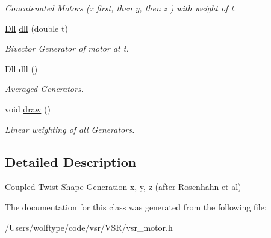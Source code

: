 \begin{DoxyCompactItemize}
\begin{DoxyCompactList}\small\item\em Concatenated Motors (x first, then y, then z ) with weight of t. \end{DoxyCompactList}\item 
\hypertarget{classvsr_1_1_coupled_twist_a1ed7598ed8ee660d1ead00ca99a66d74}{\hyperlink{namespacevsr_a6c6892b7aec25cfb16492501e2e35b11}{Dll} \hyperlink{classvsr_1_1_coupled_twist_a1ed7598ed8ee660d1ead00ca99a66d74}{dll} (double t)}\label{classvsr_1_1_coupled_twist_a1ed7598ed8ee660d1ead00ca99a66d74}

\begin{DoxyCompactList}\small\item\em Bivector Generator of motor at t. \end{DoxyCompactList}\item 
\hypertarget{classvsr_1_1_coupled_twist_ac53bf181bcc42b0ea24eb8ab668010e3}{\hyperlink{namespacevsr_a6c6892b7aec25cfb16492501e2e35b11}{Dll} \hyperlink{classvsr_1_1_coupled_twist_ac53bf181bcc42b0ea24eb8ab668010e3}{dll} ()}\label{classvsr_1_1_coupled_twist_ac53bf181bcc42b0ea24eb8ab668010e3}

\begin{DoxyCompactList}\small\item\em Averaged Generators. \end{DoxyCompactList}\item 
\hypertarget{classvsr_1_1_coupled_twist_ac609ad5ce2d0eca0ac9858699dbac63f}{void \hyperlink{classvsr_1_1_coupled_twist_ac609ad5ce2d0eca0ac9858699dbac63f}{draw} ()}\label{classvsr_1_1_coupled_twist_ac609ad5ce2d0eca0ac9858699dbac63f}

\begin{DoxyCompactList}\small\item\em Linear weighting of all Generators. \end{DoxyCompactList}\end{DoxyCompactItemize}


\subsection{Detailed Description}
Coupled \hyperlink{classvsr_1_1_twist}{Twist} Shape Generation x, y, z (after Rosenhahn et al) 

The documentation for this class was generated from the following file\-:\begin{DoxyCompactItemize}
\item 
/\-Users/wolftype/code/vsr/\-V\-S\-R/vsr\-\_\-motor.\-h\end{DoxyCompactItemize}

